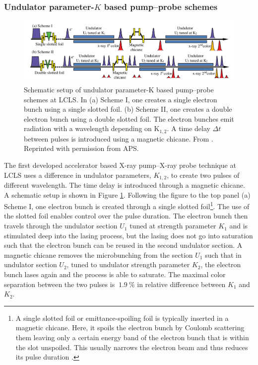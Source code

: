\subsubsection{Undulator parameter-$K$ based pump--probe schemes}
%
\begin{figure}
	\centering
		\includegraphics[width=1.00\textwidth]{images/Albertos-pump-probe-scheme.png}
	\caption[Schematic setup of an undulator based pump--probe scheme.]{Schematic setup of undulator parameter-K based pump--probe schemes at LCLS. In (a) Scheme I, one creates a single electron bunch using a single slotted foil. (b) Scheme II, one creates a double electron bunch using a double slotted foil. The electron bunches emit radiation with a wavelength depending on K$_{1,2}$. A time delay $\Delta t$ between pulses is introduced using a magnetic chicane. From \citep{Lutman-2013-PRL}. Reprinted with permission from APS.}
	\label{fig:Albertos-pump-probe-scheme}
\end{figure}
%
The first developed accelerator based X-ray pump--X-ray probe technique at LCLS \citep{Lutman-2013-PRL} uses a difference in undulator parameters, $K_{1,2}$, to create two pulses of different wavelength. The time delay is introduced through a magnetic chicane.\\[1\baselineskip]
%
A schematic setup is shown in Figure \ref{fig:Albertos-pump-probe-scheme}.
Following the figure to the top panel (a) Scheme I, one electron bunch is created through a single slotted foil\footnote{A single slotted foil or emittance-spoiling foil is typically inserted in a magnetic chicane. Here, it spoils the electron bunch by Coulomb scattering them leaving only a certain energy band of the electron bunch that is within the slot unspoiled. This usually narrows the electron beam and thus reduces its pulse duration \citep{Emma-2004-PRL}.}. The use of the slotted foil enables control over the pulse duration. The electron bunch then travels through the undulator section $U_{1}$ tuned at strength parameter $K_{1}$ and is stimulated deep into the lasing process, but the lasing does not go into saturation such that the electron bunch can be reused in the second undulator section. A magnetic chicane removes the microbunching from the section $U_{1}$ such that in undulator section $U_{2}$, tuned to undulator strength parameter $K_{2}$, the electron bunch lases again and the process is able to saturate. The maximal color separation between the two pulses is $~ \SI{1.9}{\percent}$ in relative difference between $K_{1}$ and $K_{2}$.\\[1\baselineskip]
